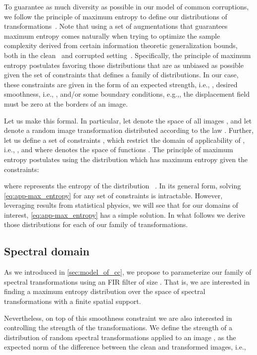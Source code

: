 \documentclass[runningheads]{llncs}
\begin{document}
To guarantee as much diversity as possible in our model of common corruptions, we follow the principle of maximum entropy to define our distributions of transformations~\cite{cover_info}. Note that using a set of augmentations that guarantees maximum entropy comes naturally when trying to optimize the sample complexity derived from certain information theoretic generalization bounds, both in the clean~\cite{xuInfoBound} and corrupted setting~\cite{OODInfoBound}. Specifically, the principle of maximum entropy postulates favoring those distributions that are as unbiased as possible given the set of constraints that defines a family of distributions. In our case, these constraints are given in the form of an expected strength, i.e., , desired smoothness, i.e., , and/or some boundary conditions, e.g.,, the displacement field must be zero at the borders of an image.  

Let us make this formal. In particular, let  denote the space of all images , and let  denote a random image transformation distributed according to the law . Further, let us define a set of constraints , which restrict the domain of applicability of , i.e., , and where  denotes the space of functions . The principle of maximum entropy postulates using the distribution  which has maximum entropy given the constraints:

where  represents the entropy of the distribution ~\cite{cover_info}. In its general form, solving \cref{eq:app-max_entropy} for any set of constraints  is intractable. However, leveraging results from statistical physics, we will see that for our domains of interest, \cref{eq:app-max_entropy} has a simple solution. In what follows we derive those distributions for each of our family of transformations.

\subsection{Spectral domain}

As we introduced in \cref{sec:model_of_cc}, we propose to parameterize our family of spectral transformations using an FIR filter of size . That is, we are interested in finding a maximum entropy distribution over the space of spectral transformations with a finite spatial support. 

Nevertheless, on top of this smoothness constraint we are also interested in controlling the strength of the transformations.  We define the strength of a distribution of random spectral transformations applied to an image , as the expected  norm of the difference between the clean and transformed images, i.e.,
\end{document}
